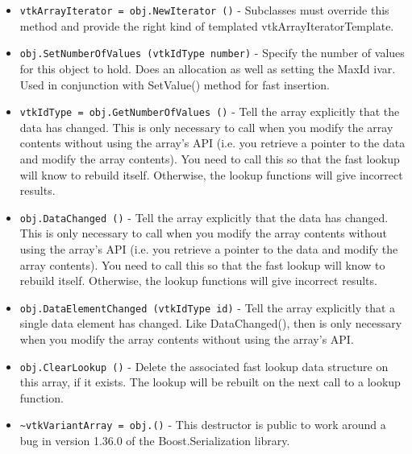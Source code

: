\begin{itemize}
\item  \verb|vtkArrayIterator = obj.NewIterator ()| -  Subclasses must override this method and provide the right 
 kind of templated vtkArrayIteratorTemplate.

\item  \verb|obj.SetNumberOfValues (vtkIdType number)| -  Specify the number of values for this object to hold. Does an
 allocation as well as setting the MaxId ivar. Used in conjunction with
 SetValue() method for fast insertion.

\item  \verb|vtkIdType = obj.GetNumberOfValues ()| -  Tell the array explicitly that the data has changed.
 This is only necessary to call when you modify the array contents
 without using the array's API (i.e. you retrieve a pointer to the
 data and modify the array contents).  You need to call this so that
 the fast lookup will know to rebuild itself.  Otherwise, the lookup
 functions will give incorrect results.

\item  \verb|obj.DataChanged ()| -  Tell the array explicitly that the data has changed.
 This is only necessary to call when you modify the array contents
 without using the array's API (i.e. you retrieve a pointer to the
 data and modify the array contents).  You need to call this so that
 the fast lookup will know to rebuild itself.  Otherwise, the lookup
 functions will give incorrect results.

\item  \verb|obj.DataElementChanged (vtkIdType id)| -  Tell the array explicitly that a single data element has
 changed. Like DataChanged(), then is only necessary when you
 modify the array contents without using the array's API. 

\item  \verb|obj.ClearLookup ()| -  Delete the associated fast lookup data structure on this array,
 if it exists.  The lookup will be rebuilt on the next call to a lookup
 function.

\item  \verb|~vtkVariantArray = obj.()| -  This destructor is public to work around a bug in version 1.36.0 of
 the Boost.Serialization library.

\end{itemize}
